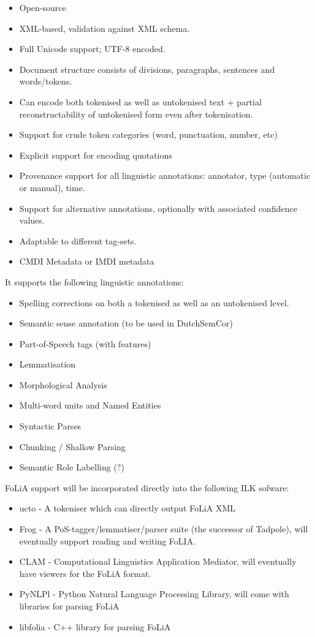 \documentclass[a4paper,12pt]{report}
\begin{document}
\begin{itemize}
\item Open-source
\item XML-based, validation against XML schema.
\item Full Unicode support; UTF-8 encoded.
\item Document structure consists of divisions, paragraphs, sentences and words/tokens.
\item Can encode both tokenised as well as untokenised text + partial reconstructability of untokenised form even after tokenisation.
\item Support for crude token categories (word, punctuation, number, etc)
\item Explicit support for encoding quotations
\item Provenance support for all linguistic annotations: annotator, type (automatic or manual), time.
\item Support for alternative annotations, optionally with associated confidence values.
\item Adaptable to different tag-sets.
\item CMDI Metadata or IMDI metadata
\end{itemize}

It supports the following linguistic annotations:

\begin{itemize}
\item Spelling corrections on both a tokenised as well as an untokenised level.
\item Semantic sense annotation (to be used in DutchSemCor)
\item Part-of-Speech tags (with features)
\item Lemmatisation
\item Morphological Analysis
\item Multi-word units and Named Entities
\item Syntactic Parses
\item Chunking / Shallow Parsing
\item Semantic Role Labelling (?)
\end{itemize}

FoLiA support will be incorporated directly into the following ILK sofware:


\begin{itemize} 
\item ucto - A tokeniser which can directly output FoLiA XML 
\item Frog - A PoS-tagger/lemmatiser/parser suite (the successor of Tadpole), will eventually support reading and writing FoLIA.
\item CLAM - Computational Linguistics Application Mediator, will eventually have viewers for the FoLiA format.
\item PyNLPl - Python Natural Language Processing Library, will come with libraries for parsing FoLiA
\item libfolia - C++ library for parsing FoLiA
\end{itemize}
\end{document}
